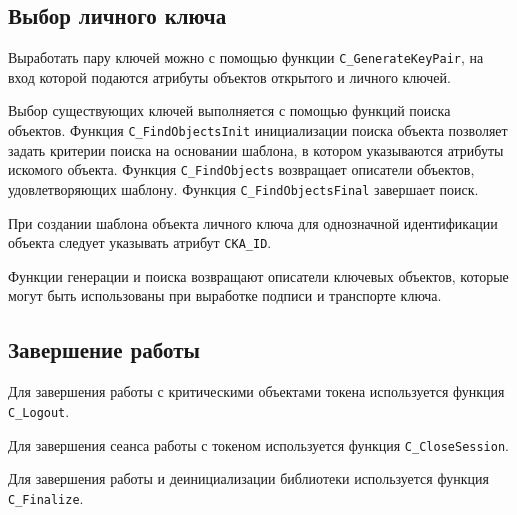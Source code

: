 
\subsection{Выбор личного ключа}

Выработать пару ключей можно с помощью функции
\verb|C_GenerateKeyPair|, на вход которой подаются атрибуты
объектов открытого и личного ключей.

Выбор существующих ключей выполняется с помощью функций
поиска объектов. Функция \verb|C_FindObjectsInit| инициализации
поиска объекта позволяет задать критерии поиска на основании
шаблона, в котором указываются атрибуты искомого объекта.
Функция \verb|C_FindObjects| возвращает описатели объектов,
удовлетворяющих шаблону. Функция \verb|C_FindObjectsFinal|
завершает поиск.

При создании шаблона объекта личного ключа для однозначной
идентификации объекта следует указывать атрибут \verb|CKA_ID|.

Функции генерации и поиска возвращают описатели ключевых
объектов, которые могут быть использованы при выработке подписи
и транспорте ключа.



\subsection{Завершение работы}

Для завершения работы с критическими объектами токена
используется функция \verb|C_Logout|.

Для завершения сеанса работы с токеном используется функция
\verb|C_CloseSession|.

Для завершения работы и деинициализации библиотеки
используется функция \verb|C_Finalize|.
\fi
